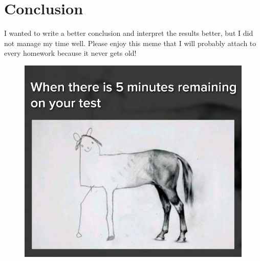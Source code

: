 \documentclass[a4paper, 9pt]{article}
\begin{document}
\section{Conclusion}
I wanted to write a better conclusion and interpret the results better, but I did not manage my time well. Please enjoy this meme that I will probably attach to every homework because it never gets old! 
\begin{figure}[b!]
    \centering
    \includegraphics[scale=0.2]{IMG.JPG}
\end{figure}
\end{document}
